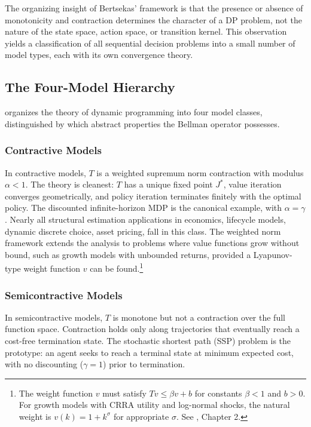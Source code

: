 The organizing insight of Bertsekas' framework is that the presence or absence of monotonicity and contraction determines the character of a DP problem, not the nature of the state space, action space, or transition kernel. This observation yields a classification of all sequential decision problems into a small number of model types, each with its own convergence theory.


\subsection{The Four-Model Hierarchy}
\label{sec:four_models}

\citet{bertsekas2022} organizes the theory of dynamic programming into four model classes, distinguished by which abstract properties the Bellman operator possesses.

\subsubsection{Contractive Models}

In contractive models, $T$ is a weighted supremum norm contraction with modulus $\alpha < 1$. The theory is cleanest: $T$ has a unique fixed point $J^*$, value iteration converges geometrically, and policy iteration terminates finitely with the optimal policy. The discounted infinite-horizon MDP is the canonical example, with $\alpha = \gamma$. Nearly all structural estimation applications in economics, lifecycle models, dynamic discrete choice, asset pricing, fall in this class. The weighted norm framework extends the analysis to problems where value functions grow without bound, such as growth models with unbounded returns, provided a Lyapunov-type weight function $v$ can be found.\footnote{The weight function $v$ must satisfy $Tv \leq \beta v + b$ for constants $\beta < 1$ and $b > 0$. For growth models with CRRA utility and log-normal shocks, the natural weight is $v(k) = 1 + k^\sigma$ for appropriate $\sigma$. See \citet{bertsekas2022}, Chapter 2.}

\subsubsection{Semicontractive Models}

In semicontractive models, $T$ is monotone but not a contraction over the full function space. Contraction holds only along trajectories that eventually reach a cost-free termination state. The stochastic shortest path (SSP) problem is the prototype: an agent seeks to reach a terminal state at minimum expected cost, with no discounting ($\gamma = 1$) prior to termination.

